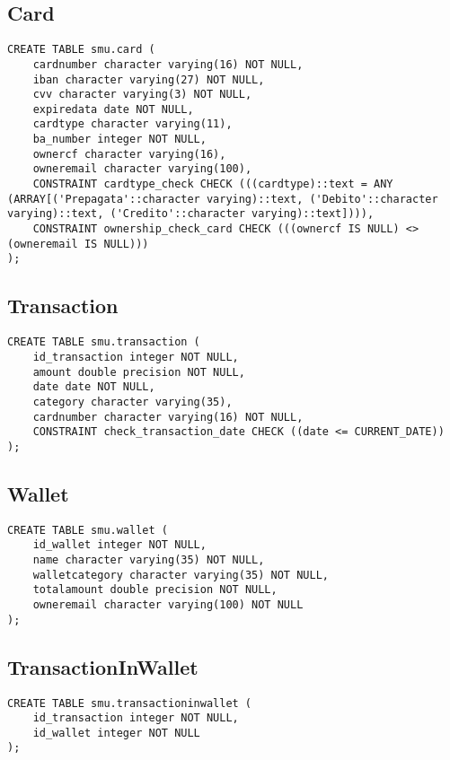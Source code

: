 \subsection{Card}

\begin{lstlisting}
CREATE TABLE smu.card (
    cardnumber character varying(16) NOT NULL,
    iban character varying(27) NOT NULL,
    cvv character varying(3) NOT NULL,
    expiredata date NOT NULL,
    cardtype character varying(11),
    ba_number integer NOT NULL,
    ownercf character varying(16),
    owneremail character varying(100),
    CONSTRAINT cardtype_check CHECK (((cardtype)::text = ANY (ARRAY[('Prepagata'::character varying)::text, ('Debito'::character varying)::text, ('Credito'::character varying)::text]))),
    CONSTRAINT ownership_check_card CHECK (((ownercf IS NULL) <> (owneremail IS NULL)))
);
\end{lstlisting}

\subsection{Transaction}

\begin{lstlisting}
CREATE TABLE smu.transaction (
    id_transaction integer NOT NULL,
    amount double precision NOT NULL,
    date date NOT NULL,
    category character varying(35),
    cardnumber character varying(16) NOT NULL,
    CONSTRAINT check_transaction_date CHECK ((date <= CURRENT_DATE))
);
\end{lstlisting}

\subsection{Wallet}

\begin{lstlisting}
CREATE TABLE smu.wallet (
    id_wallet integer NOT NULL,
    name character varying(35) NOT NULL,
    walletcategory character varying(35) NOT NULL,
    totalamount double precision NOT NULL,
    owneremail character varying(100) NOT NULL
);
\end{lstlisting}

\subsection{TransactionInWallet}

\begin{lstlisting}
CREATE TABLE smu.transactioninwallet (
    id_transaction integer NOT NULL,
    id_wallet integer NOT NULL
);
\end{lstlisting}

